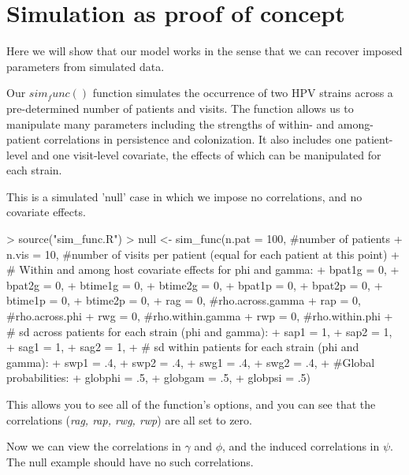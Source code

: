\documentclass{article}
\begin{document}
\section*{Simulation as proof of concept}

Here we will show that our model works in the sense that we can recover imposed parameters from simulated data. 

Our $sim_func()$ function simulates the occurrence of two HPV strains across a pre-determined number of patients and visits. The function allows us to manipulate many parameters including the strengths of within- and among-patient correlations in persistence and colonization. It also includes one patient-level and one visit-level covariate, the effects of which can be manipulated for each strain.

This is a simulated 'null' case in which we impose no correlations, and no covariate effects. 
\begin{Schunk}
\begin{Sinput}
> source("sim_func.R")
> null <- sim_func(n.pat = 100, #number of patients
+                  n.vis = 10,  #number of visits per patient (equal for each patient at this point)
+                  # Within and among host covariate effects for phi and gamma:
+                  bpat1g = 0, 
+                  bpat2g = 0,
+                  btime1g = 0,
+                  btime2g = 0,
+                  bpat1p = 0,
+                  bpat2p = 0,
+                  btime1p = 0,
+                  btime2p = 0,
+                  rag = 0, #rho.across.gamma
+                  rap = 0, #rho.across.phi
+                  rwg = 0, #rho.within.gamma
+                  rwp = 0, #rho.within.phi
+                  # sd across patients for each strain (phi and gamma):
+                  sap1 = 1, 
+                  sap2 = 1,
+                  sag1 = 1,
+                  sag2 = 1,
+                  # sd within patients for each strain (phi and gamma):
+                  swp1 = .4, 
+                  swp2 = .4,
+                  swg1 = .4,
+                  swg2 = .4,
+                  #Global probabilities:
+                  globphi = .5, 
+                  globgam = .5, 
+                  globpsi = .5)
\end{Sinput}
\end{Schunk}
This allows you to see all of the function's options, and you can see that the correlations (\emph{rag, rap, rwg, rwp}) are all set to zero.

Now we can view the correlations in $\gamma$ and $\phi$, and the induced correlations in $\psi$. The null example should have no such correlations.
\end{document}
